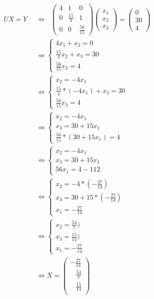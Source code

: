 \documentclass{article}
\begin{document}
\begin{align*}
UX=Y \;\; & \Leftrightarrow \;\; \begin{pmatrix}
4 & 1 & 0 \\
0 & \frac{15}{4} & 1 \\
0 & 0 & \frac{56}{15}
\end{pmatrix}
\begin{pmatrix}
x_1 \\
x_2 \\
x_3  
\end{pmatrix} = \begin{pmatrix}
0 \\
30 \\
4  
\end{pmatrix}
\\[5pt]
&\Leftrightarrow \left\{\begin{array}{ll}
4x_1+x_2=0 \\[5pt] 
\frac{15}{4}x_2+x_3 = 30 \\[5pt] 
\frac{56}{15}x_3 = 4
\end{array}\right.
\\[5pt]  
&\Leftrightarrow \left\{\begin{array}{ll}
x_2=-4x_1 \\[5pt] 
\frac{15}{4} * (-4x_1) + x_3 = 30 \\[5pt] 
\frac{56}{15}x_3=4
\end{array}\right.
\\[5pt] 
&\Leftrightarrow \left\{\begin{array}{ll}
x_2=-4x_1 \\[5pt] 
x_3 = 30 + 15x_1 \\[5pt] 
\frac{56}{15} * (30 + 15x_1) = 4
\end{array}\right.
\\[5pt] 
&\Leftrightarrow \left\{\begin{array}{ll}
x_2=-4x_1 \\[5pt] 
x_3 = 30 + 15x_1 \\[5pt] 
56x_1 = 4 - 112
\end{array}\right.
\\[5pt] 
&\Leftrightarrow \left\{\begin{array}{ll}
x_2=-4 * (- \frac{27}{14}) \\[5pt] 
x_3 = 30 + 15 * (- \frac{27}{14}) \\[5pt] 
x_1 = - \frac{27}{14}
\end{array}\right.
\\[5pt] 
&\Leftrightarrow \left\{\begin{array}{ll}
x_2=\frac{54}{7}) \\[5pt] 
x_3 = \frac{15}{14}) \\[5pt] 
x_1 = - \frac{27}{14}
\end{array}\right.
\\[5pt]  
&\Leftrightarrow X=\begin{pmatrix}
-\frac{27}{14} \\[5pt] 
 \;\;\;\frac{54}{7} \\[5pt] 
\;\;\;\frac{15}{14} \\[5pt] 
\end{pmatrix}
\end{align*}
\end{document}
